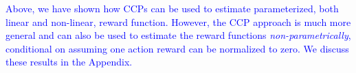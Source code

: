 \documentclass{article}
\begin{document}
\textcolor{blue}{
Above, we have shown how CCPs can be used to estimate parameterized, both linear and non-linear, reward function. However, the CCP approach is much more general and can also be used to estimate the reward functions \textit{non-parametrically}, conditional on assuming one action reward can be normalized to zero. We discuss these results in the Appendix.
}
\end{document}
